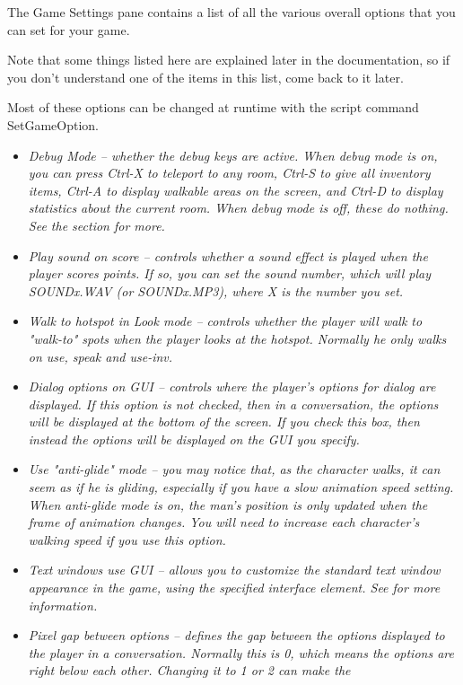 The Game Settings pane contains a list of all the various overall options
that you can set for your game.

Note that some things listed here are explained later in the documentation,
so if you don't understand one of the items in this list, come back to it
later.

Most of these options can be changed at runtime with the script command SetGameOption.
\begin{itemize}
\item \it{Debug Mode} -- whether the debug keys are active. When debug mode is on,
you can press Ctrl-X to teleport to any room, Ctrl-S to give all inventory
items, Ctrl-A to display walkable areas on the screen, and Ctrl-D to display
statistics about the current room. When debug mode is off, these do nothing.
See the  section for more.
\item \it{Play sound on score} -- controls whether a sound effect is played when
the player scores points. If so, you can set the sound number, which will
play SOUNDx.WAV (or SOUNDx.MP3), where X is the number you set.
\item \it{Walk to hotspot in Look mode} -- controls whether the player will walk
to "walk-to" spots when the player looks at the hotspot. Normally he only
walks on use, speak and use-inv.
\item \it{Dialog options on GUI} -- controls where the player's options for dialog are
displayed. If this option is not checked, then in a conversation, the options
will be displayed at the bottom of the screen. If you check this box, then
instead the options will be displayed on the GUI you specify.
\item \it{Use "anti-glide" mode} -- you may notice that, as the character walks, it
can seem as if he is gliding, especially if you have a slow animation speed
setting. When anti-glide mode is on, the man's position is only updated
when the frame of animation changes. You will need to increase each
character's walking speed if you use this option.
\item \it{Text windows use GUI} -- allows you to customize the standard text window
appearance in the game, using the specified interface element. See 
for more information.
\item \it{Pixel gap between options} -- defines the gap between the options displayed
to the player in a conversation. Normally this is 0, which means the
options are right below each other. Changing it to 1 or 2 can make the

\end{itemize}
